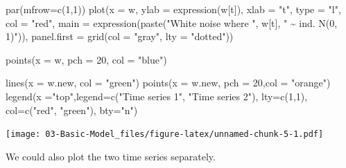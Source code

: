 \documentclass[
]{book}
\newenvironment{Shaded}{\begin{snugshade}}{\end{snugshade}}
\newcommand{\AttributeTok}[1]{\textcolor[rgb]{0.77,0.63,0.00}{#1}}
\newcommand{\DecValTok}[1]{\textcolor[rgb]{0.00,0.00,0.81}{#1}}
\newcommand{\FunctionTok}[1]{\textcolor[rgb]{0.00,0.00,0.00}{#1}}
\newcommand{\NormalTok}[1]{#1}
\newcommand{\StringTok}[1]{\textcolor[rgb]{0.31,0.60,0.02}{#1}}
\theoremstyle{definition}
\theoremstyle{definition}
\theoremstyle{definition}
\theoremstyle{definition}
\theoremstyle{remark}
\begin{document}
\begin{Shaded}
\begin{Highlighting}[]
\FunctionTok{par}\NormalTok{(}\AttributeTok{mfrow=}\FunctionTok{c}\NormalTok{(}\DecValTok{1}\NormalTok{,}\DecValTok{1}\NormalTok{))}
\FunctionTok{plot}\NormalTok{(}\AttributeTok{x =}\NormalTok{ w, }
     \AttributeTok{ylab =} \FunctionTok{expression}\NormalTok{(w[t]), }\AttributeTok{xlab =} \StringTok{"t"}\NormalTok{, }
     \AttributeTok{type =} \StringTok{"l"}\NormalTok{, }\AttributeTok{col =} \StringTok{"red"}\NormalTok{,}
     \AttributeTok{main =} \FunctionTok{expression}\NormalTok{(}\FunctionTok{paste}\NormalTok{(}\StringTok{"White noise where "}\NormalTok{, w[t], }\StringTok{" \textasciitilde{} ind. N(0, 1)"}\NormalTok{)), }
     \AttributeTok{panel.first =} \FunctionTok{grid}\NormalTok{(}\AttributeTok{col =} \StringTok{"gray"}\NormalTok{, }\AttributeTok{lty =} \StringTok{"dotted"}\NormalTok{))}

\FunctionTok{points}\NormalTok{(}\AttributeTok{x =}\NormalTok{ w, }\AttributeTok{pch =} \DecValTok{20}\NormalTok{, }\AttributeTok{col =} \StringTok{"blue"}\NormalTok{)}

\FunctionTok{lines}\NormalTok{(}\AttributeTok{x =}\NormalTok{ w.new, }\AttributeTok{col =} \StringTok{"green"}\NormalTok{)}
\FunctionTok{points}\NormalTok{(}\AttributeTok{x =}\NormalTok{ w.new, }\AttributeTok{pch =} \DecValTok{20}\NormalTok{,}\AttributeTok{col =} \StringTok{"orange"}\NormalTok{)}
\FunctionTok{legend}\NormalTok{(}\AttributeTok{x =}\StringTok{"top"}\NormalTok{,}\AttributeTok{legend=}\FunctionTok{c}\NormalTok{(}\StringTok{"Time series 1"}\NormalTok{, }\StringTok{"Time series 2"}\NormalTok{), }\AttributeTok{lty=}\FunctionTok{c}\NormalTok{(}\DecValTok{1}\NormalTok{,}\DecValTok{1}\NormalTok{), }\AttributeTok{col=}\FunctionTok{c}\NormalTok{(}\StringTok{"red"}\NormalTok{, }\StringTok{"green"}\NormalTok{), }
      \AttributeTok{bty=}\StringTok{"n"}\NormalTok{)}
\end{Highlighting}
\end{Shaded}

\texttt{[image: 03-Basic-Model\_files/figure-latex/unnamed-chunk-5-1.pdf]}

We could also plot the two time series separately.
\end{document}

